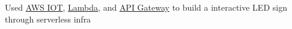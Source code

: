 {Used \href{https://aws.amazon.com/iot/}{AWS IOT}, \href{https://aws.amazon.com/lambda/}{Lambda}, and \href{https://aws.amazon.com/api-gateway/}{API Gateway} to build a interactive LED sign through serverless infra}
